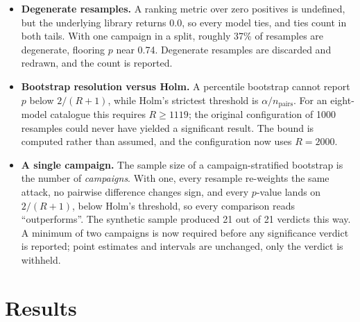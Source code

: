 \documentclass[11pt,a4paper]{article}
\begin{document}
\begin{itemize}
  \item \textbf{Degenerate resamples.} A ranking metric over zero positives is
  undefined, but the underlying library returns $0.0$, so every model ties, and
  ties count in both tails. With one campaign in a split, roughly 37\% of
  resamples are degenerate, flooring $p$ near 0.74. Degenerate resamples are
  discarded and redrawn, and the count is reported.

  \item \textbf{Bootstrap resolution versus Holm.} A percentile bootstrap cannot
  report $p$ below $2/(R+1)$, while Holm's strictest threshold is
  $\alpha / n_{\text{pairs}}$. For an eight-model catalogue this requires
  $R \geq 1119$; the original configuration of 1000 resamples could never have
  yielded a significant result. The bound is computed rather than assumed, and
  the configuration now uses $R = 2000$.

  \item \textbf{A single campaign.} The sample size of a campaign-stratified
  bootstrap is the number of \emph{campaigns}. With one, every resample
  re-weights the same attack, no pairwise difference changes sign, and every
  $p$-value lands on $2/(R+1)$, below Holm's threshold, so every comparison
  reads ``outperforms''. The synthetic sample produced 21 out of 21 verdicts this
  way. A minimum of two campaigns is now required before any significance verdict
  is reported; point estimates and intervals are unchanged, only the verdict is
  withheld.
\end{itemize}

\section{Results}
\label{sec:results}
\end{document}
